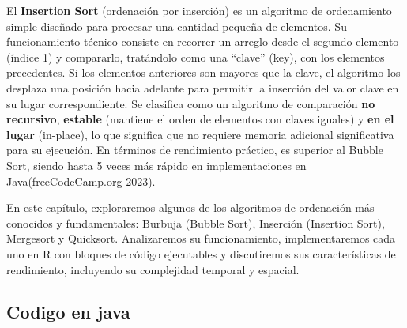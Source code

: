 \documentclass[
  spanish,
  letterpaper,
  DIV=11,
  numbers=noendperiod]{scrreprt}
\begin{document}
El \textbf{Insertion Sort} (ordenación por inserción) es un algoritmo de
ordenamiento simple diseñado para procesar una cantidad pequeña de
elementos. Su funcionamiento técnico consiste en recorrer un arreglo
desde el segundo elemento (índice 1) y compararlo, tratándolo como una
``clave'' (key), con los elementos precedentes. Si los elementos
anteriores son mayores que la clave, el algoritmo los desplaza una
posición hacia adelante para permitir la inserción del valor clave en su
lugar correspondiente. Se clasifica como un algoritmo de comparación
\textbf{no recursivo}, \textbf{estable} (mantiene el orden de elementos
con claves iguales) y \textbf{en el lugar} (in-place), lo que significa
que no requiere memoria adicional significativa para su ejecución. En
términos de rendimiento práctico, es superior al Bubble Sort, siendo
hasta 5 veces más rápido en implementaciones en Java({freeCodeCamp.org}
2023).

En este capítulo, exploraremos algunos de los algoritmos de ordenación
más conocidos y fundamentales: Burbuja (Bubble Sort), Inserción
(Insertion Sort), Mergesort y Quicksort. Analizaremos su funcionamiento,
implementaremos cada uno en R con bloques de código ejecutables y
discutiremos sus características de rendimiento, incluyendo su
complejidad temporal y espacial.

\subsection{\texorpdfstring{\textbf{Codigo en
java}}{Codigo en java}}\label{codigo-en-java}
\end{document}
